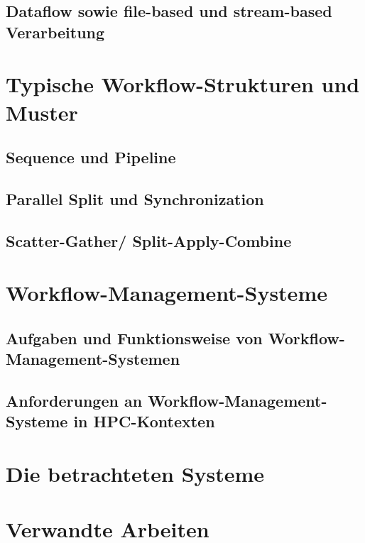 \subsection{Dataflow sowie file-based und stream-based Verarbeitung}
\label{sec:basics:concepts:dataflow}

\section{Typische Workflow-Strukturen und Muster}
\label{sec:basics:patterns}

\subsection{Sequence und Pipeline}
\label{sec:basics:patterns:pipeline}

\subsection{Parallel Split und Synchronization}
\label{sec:basics:patterns:parallel}

\subsection{Scatter-Gather/ Split-Apply-Combine}
\label{sec:basics:patterns:scatter}

\section{Workflow-Management-Systeme}
\label{sec:basics:wms}

\subsection{Aufgaben und Funktionsweise von Workflow-Management-Systemen}
\label{sec:basics:wms:tasks}

\subsection{Anforderungen an Workflow-Management-Systeme in HPC-Kontexten}
\label{sec:basics:wms:hpc-requirements}
\section{Die betrachteten Systeme}
\label{sec:basics:systeme}

\section{Verwandte Arbeiten}
\label{sec:basics:verwandte}

